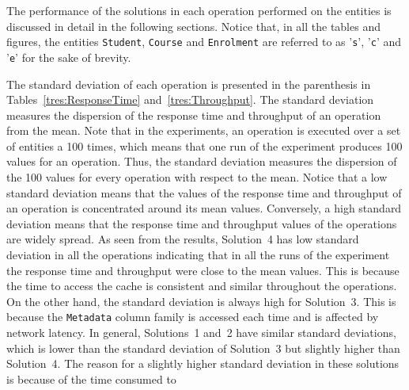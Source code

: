 The performance of the solutions in each
operation performed on the entities is discussed in detail in the following
sections.  Notice that,  in all the tables and figures,   the
entities \texttt{Student},  \texttt{Course} and \texttt{Enrolment} are referred
to as '\texttt{s}',  '\texttt{c}' and '\texttt{e}' for the sake of brevity. 

The standard deviation of each operation is presented in the parenthesis in
Tables~\ref{tres:ResponseTime} and~\ref{tres:Throughput}. The standard deviation
measures the dispersion of the response time and throughput of an operation from
the mean. Note that in the experiments, an operation is executed over a set of
entities a 100 times, which means that one run of the experiment produces 100
values for an operation. Thus, the standard deviation measures the dispersion of
the 100 values for every operation with respect to the mean. Notice that a  low
standard deviation means that the values of the response time and throughput of
an operation is concentrated around its mean values. Conversely, a high standard
deviation means that the response time and throughput values of the operations
are widely spread. As seen from the results, Solution~4 has low standard
deviation in all the operations indicating that in all the runs of the
experiment the response time and throughput were close to the mean values. This
is because the time to access the cache is consistent and similar throughout the
operations. On the other hand, the standard deviation is always high for
Solution~3. This is because the \texttt{Metadata} column family is accessed each
time and is affected by network latency. In general, Solutions~1 and~2 have
similar standard deviations, which is lower than the standard deviation of
Solution~3 but slightly higher than Solution~4. The reason for a slightly higher
standard deviation in these solutions is because of the time consumed to





